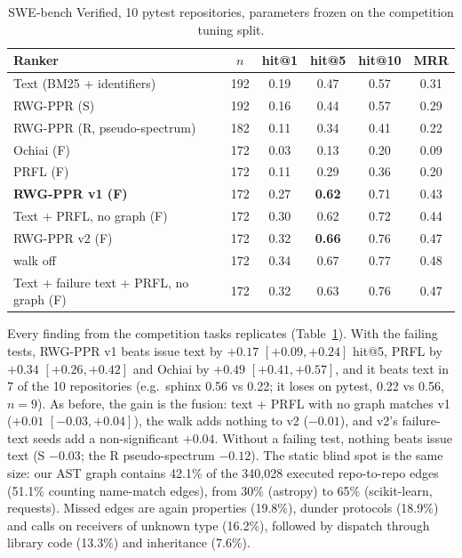\documentclass[10pt]{article}
\begin{document}
\begin{table}[h]
\centering\small
\begin{tabular}{lccccc}
\toprule
Ranker & $n$ & hit@1 & hit@5 & hit@10 & MRR \\
\midrule
Text (BM25 + identifiers) & 192 & 0.19 & 0.47 & 0.57 & 0.31 \\
RWG-PPR (S) & 192 & 0.16 & 0.44 & 0.57 & 0.29 \\
RWG-PPR (R, pseudo-spectrum) & 182 & 0.11 & 0.34 & 0.41 & 0.22 \\
Ochiai (F) & 172 & 0.03 & 0.13 & 0.20 & 0.09 \\
PRFL (F) & 172 & 0.11 & 0.29 & 0.36 & 0.20 \\
\textbf{RWG-PPR v1 (F)} & 172 & 0.27 & \textbf{0.62} & 0.71 & 0.43 \\
Text + PRFL, no graph (F) & 172 & 0.30 & 0.62 & 0.72 & 0.44 \\
RWG-PPR v2 (F) & 172 & 0.32 & \textbf{0.66} & 0.76 & 0.47 \\
\quad walk off & 172 & 0.34 & 0.67 & 0.77 & 0.48 \\
Text + failure text + PRFL, no graph (F) & 172 & 0.32 & 0.63 & 0.76 & 0.47 \\
\bottomrule
\end{tabular}
\caption{SWE-bench Verified, 10 pytest repositories, parameters frozen on the competition tuning split.}
\label{tab:swe}
\end{table}

Every finding from the competition tasks replicates (Table~\ref{tab:swe}). With the failing tests, RWG-PPR v1 beats
issue text by $+0.17$ $[+0.09, +0.24]$ hit@5, PRFL by $+0.34$ $[+0.26, +0.42]$ and Ochiai by $+0.49$ $[+0.41, +0.57]$,
and it beats text in 7 of the 10 repositories (e.g.\ sphinx 0.56 vs 0.22; it loses on pytest, 0.22 vs 0.56, $n=9$). As
before, the gain is the fusion: text + PRFL with no graph matches v1 ($+0.01$ $[-0.03, +0.04]$), the walk adds nothing
to v2 ($-0.01$), and v2's failure-text seeds add a non-significant $+0.04$. Without a failing test, nothing beats issue
text (S $-0.03$; the R pseudo-spectrum $-0.12$). The static blind spot is the same size: our AST graph contains
42.1\% of the 340{,}028 executed repo-to-repo edges (51.1\% counting name-match edges), from 30\% (astropy) to 65\%
(scikit-learn, requests). Missed edges are again properties (19.8\%), dunder protocols (18.9\%) and calls on receivers of
unknown type (16.2\%), followed by dispatch through library code (13.3\%) and inheritance (7.6\%).
\end{document}
